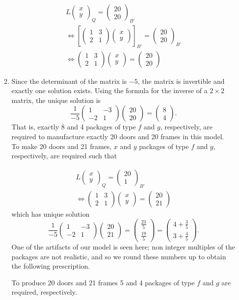 \documentclass[12pt]{article}
\def\ba{\left(\begin{array}{cc}}
\def\ea{\end{array}\right) }
\def\bv{\left(\begin{array}{c}}
\def\ev{\end{array}\right) }
\def\LR{\Leftrightarrow}
\begin{document}
\begin{enumerate}
\begin{enumerate}
\begin{gather*}L\bv x\\y \ev_Q = \bv 20\\20 \ev_{B'}\\
\LR 
\left[       \ba 1&3\\2&1\ea \bv x\\y \ev 
\right]_{B'}= \bv 20\\20 \ev_{B'}
\\
\LR 
      \ba 1&3\\2&1\ea \bv x\\y \ev 
= \bv 20\\20 \ev
\end{gather*}
\item 
Since the determinant of the matrix is $-5$, the matrix is invertible and exactly one solution exists. Using the formula for the inverse of a $2\times 2$ matrix, the unique solution is
\[
\frac{1}{-5}   \ba1&-3 \\ -2&1 \ea \bv 20\\20 \ev = \bv 8 \\ 4 \ev.\] 
That is, exactly 8 and 4 packages of type $f$ and $g$, respectively, are required to manufacture exactly 20 doors and 20 frames in this model. \\

To make 20 doors and 21 frames, $x$ and $y$ packages of type $f$ and $g$, respectively, are required such that 

\begin{gather*}L\bv x\\y \ev_Q = \bv 20\\1 \ev_{B'}\\
\LR 
      \ba 1&3\\2&1\ea \bv x\\y \ev 
= \bv 20\\21 \ev
\end{gather*}
which  has unique solution  
\[
\frac{1}{-5}   \ba1&-3 \\ -2&1 \ea \bv 20\\21 \ev 
= 
\bv \frac{23}{5}  \\  \frac{19}{5}\ev 
=
\bv 4+\frac{3}{5}  \\  3+\frac{4}{5}\ev 
.\] 
One of the artifacts of our model is seen here; non integer multiples of the packages are not realistic, 
and so we  round these numbers up to obtain the following prescription.

To produce 20 doors and 21 frames 5 and 4 packages of type $f$ and $g$ are required, respectively. 
\end{enumerate}
\end{enumerate}
\end{document}
